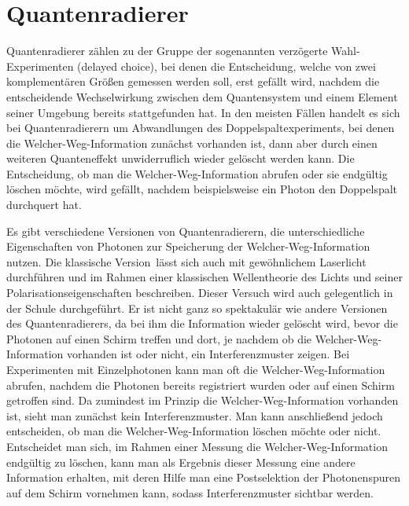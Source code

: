 

\chapter{Quantenradierer}
\label{chap_Quantenradierer}

%
Quantenradierer 
z\"ahlen zu der Gruppe der sogenannten \glqq verz\"ogerte Wahl\grqq-Experimenten
(delayed choice), 
bei denen die Entscheidung, welche von zwei komplement\"aren Gr\"o\ss en
gemessen werden soll, erst gef\"allt wird, nachdem die entscheidende Wechselwirkung zwischen dem
Quantensystem und einem Element seiner Umgebung bereits stattgefunden hat. In den meisten
F\"allen handelt es sich bei Quantenradierern um Abwandlungen des 
Doppelspaltexperiments, bei 
denen die \glqq Welcher-Weg\grqq-Information zun\"achst vorhanden ist, dann aber durch
einen weiteren Quanteneffekt unwiderruflich wieder gel\"oscht werden kann. Die Entscheidung,
ob man die \glqq Welcher-Weg\grqq-Information abrufen oder sie endg\"ultig l\"oschen m\"ochte,
wird gef\"allt, nachdem beispielsweise ein Photon  den Doppelspalt durchquert hat. 

Es gibt verschiedene Versionen von Quantenradierern, die unterschiedliche Eigenschaften
von Photonen zur Speicherung der \glqq Welcher-Weg\grqq-Information nutzen. Die
\glqq klassische Version\grqq\ l\"asst sich auch mit gew\"ohnlichem Laserlicht durchf\"uhren und
im Rahmen einer klassischen Wellentheorie des Lichts und seiner Polarisationseigenschaften
beschreiben. Dieser Versuch wird auch gelegentlich in der Schule durchgef\"uhrt. Er ist nicht ganz
so spektakul\"ar wie andere Versionen des Quantenradierers, da bei ihm die Information wieder
gel\"oscht wird, bevor die Photonen auf einen Schirm treffen und dort, je nachdem ob die
\glqq Welcher-Weg\grqq-Information vorhanden ist oder nicht, ein Interferenzmuster zeigen.
Bei Experimenten mit Einzelphotonen kann man oft die \glqq Welcher-Weg\grqq-Information
abrufen, nachdem die Photonen bereits registriert wurden oder auf einen Schirm 
getroffen sind. Da zumindest
im Prinzip die \glqq Welcher-Weg\grqq-Information vorhanden ist, sieht man zun\"achst kein
Interferenzmuster. Man kann anschlie\ss end jedoch entscheiden, ob man die 
\glqq Welcher-Weg\grqq-Information l\"oschen m\"ochte oder nicht. Entscheidet man sich,
im Rahmen einer Messung die \glqq Welcher-Weg\grqq-Information endg\"ultig zu l\"oschen, kann man 
als Ergebnis dieser Messung eine andere Information erhalten, mit deren Hilfe man eine Postselektion 
der Photonenspuren auf dem Schirm vornehmen kann, sodass Interferenzmuster sichtbar werden.

